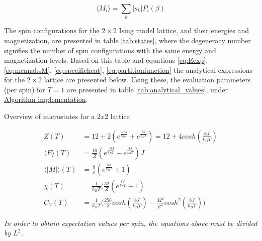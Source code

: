 \documentclass[%
oneside,                 %
final,                   %
10pt]{article}
\begin{document}
\begin{equation}
\langle M_i \rangle =\sum_{k} |s_k| P_i(\beta)
\label{eq:meanabsM}
\end{equation}

The spin configurations for the $2 \times 2$ Ising model lattice, and their energies and magnetization, are presented in table \ref{tab:states}, where the degeneracy number signifies the number of spin configurations with the same energy and magnetization levels. Based on this table and equations \eqref{eq:Eexp}, \eqref{eq:meanabsM}, \ref{eq:specificheat}, \eqref{eq:partitionfunction} the analytical expressions for the $2 \times 2$ lattice are presented below. Using these, the evaluation parameters (per spin) for $T=1$ are presented in table \ref{tab:analytical_values}, under \hyperref[SS:init.algo.impl]{Algorithm implementation}.\newline

\begin{table}[h!tb]
    \centering
    \caption{Overview of microstates for a $2x2$ lattice}
\label{tab:states}
\end{table}

\begin{align}
Z(T)&=12+2(e^{\frac{-8J}{k_B T}}+e^{\frac{8J}{k_B T}})=12+4 cosh(\frac{8J}{k_B T}) \label{eq:Z(T)}\\
\langle E \rangle (T)&= \frac{16}{Z}( e^{\frac{-8J}{k_B T}} -e^{\frac{8J}{k_B T}})J \\
\langle |M| \rangle (T)&=\frac{8}{Z}(e^{\frac{8J}{k_B T}}+1) \\
\chi (T)&=\frac{1}{k_BT}(\frac{32}{Z}(e^{\frac{8J}{k_B T}} +1)\\
C_V (T)&=\frac{1}{k_BT} \big( \frac{256}{Z} cosh(\frac{8J}{k_B T}) -\frac{32^2}{Z^2}cosh^2(\frac{8J}{k_B T})\big) \label{eq:C_v(T)}
\end{align} 

\textit{In order to obtain expectation values per spin, the equations above must be divided by $L^2$.}
\end{document}

